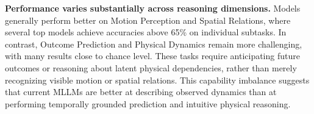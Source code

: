 \textbf{Performance varies substantially across reasoning dimensions.}
Models generally perform better on Motion Perception and Spatial Relations, where several top models achieve accuracies above 65\% on individual subtasks.
In contrast, Outcome Prediction and Physical Dynamics remain more challenging, with many results close to chance level.
These tasks require anticipating future outcomes or reasoning about latent physical dependencies, rather than merely recognizing visible motion or spatial relations.
This capability imbalance suggests that current MLLMs are better at describing observed dynamics than at performing temporally grounded prediction and intuitive physical reasoning.

\begin{table}[!t]
    \centering
    \caption{
        \textbf{Effect of text-based CoT prompting on ViSTR-Bench.}
        We evaluate Gemini-3.1-Pro-Preview~\citep{Gemini} with \emph{Direct Prompting} and various text-based CoT prompting strategies.
        \emph{Avg.} denotes the overall accuracy (\%) averaged over all question-answer pairs, and $\Delta$ denotes the accuracy change relative to \emph{Direct Prompting}.
        The best and second-best results are highlighted with \bestcap{} and \secondcap{}, respectively.
    }
    \label{tab:text_cot}

\end{table}
